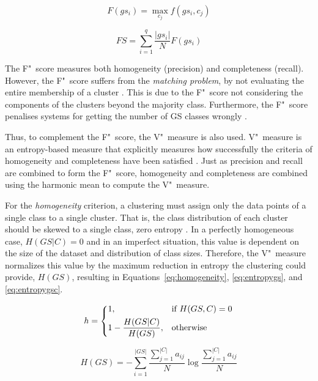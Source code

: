 \begin{equation} \label{eq:fscoregs}
 F(gs_i) = \underset{c_j}{\max} f(gs_i, c_j)
\end{equation}

\begin{equation} \label{eq:fscore}
 FS = \sum_{i=1}^q \frac{|gs_i|}{N}F(gs_i)
\end{equation}

The F"~score measures both homogeneity (precision) and completeness (recall).
However, the F"~score suffers from the \textit{matching problem}, by not
evaluating the entire membership of a cluster \citep{rosenberg2007v}. This is
due to the F"~score not considering the components of the clusters beyond the
majority class. Furthermore, the F"~score penalises systems for getting the
number of \ac{GS} classes wrongly \citep{manandhar2009semeval}.

Thus, to complement the F"~score, the V"~measure is also used. V"~measure is an
entropy-based measure that explicitly measures how successfully the criteria
of homogeneity and completeness have been satisfied \citep{rosenberg2007v}. Just
as precision and recall are combined to form the F"~score, homogeneity and
completeness are combined using the harmonic mean to compute the V"~measure.

For the \emph{homogeneity} criterion, a clustering must assign only the data 
points of a single class to a single cluster. That is, the class distribution 
of each cluster should be skewed to a single class, zero entropy 
\citep{rosenberg2007v}. In a perfectly homogeneous case, $H(GS|C) = 0$ and in 
an imperfect situation, this value is dependent on the size of the dataset and 
distribution of class sizes. Therefore, the V"~measure normalizes this value by 
the maximum reduction in entropy the clustering could provide, $H(GS)$, 
resulting in Equations~\ref{eq:homogeneity}, \ref{eq:entropygs}, and 
\ref{eq:entropygsc}.

\begin{equation} \label{eq:homogeneity}
 h = \begin{dcases}
      1,                        & \text{if } H(GS,C) = 0 \\
      1 - \frac{H(GS|C)}{H(GS)},& \text{otherwise} \\
     \end{dcases}
\end{equation}

\begin{equation} \label{eq:entropygs}
 H(GS) = - \sum_{i=1}^{|GS|} \frac{\sum_{j=1}^{|C|} a_{ij}}{N}
         \log \frac{\sum_{j=1}^{|C|} a_{ij}}{N}
\end{equation}

